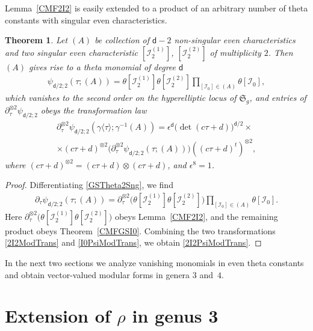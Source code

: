 \documentclass[twoside]{amsart}
\newcommand{\I}{\mathcal{I}}
\newcommand{\dd}{\textsf{d}}
\newtheorem{theo}{Theorem}[section]
\theoremstyle{definition}
\theoremstyle{plain}
\begin{document}
Lemma~\ref{CMF2I2} is easily extended to a product of an arbitrary number 
of theta constants with singular even characteristics.

\begin{theo}\label{CMFGS2I2}
Let $(A)$ be collection of $\dd-2$ non-singular even characteristics 
and two singular even characteristic $[\I_2^{(1)}]$, $[\I_2^{(2)}]$ of multiplicity $2$. 
Then  $(A)$ gives rise to a theta monomial of degree $\dd$
\begin{gather}\label{GSTheta2Sng}
\psi_{\dd/2;2}(\tau; (A)) 
= \theta[\I_2^{(1)}] \theta[\I_2^{(2)}] \prod_{[\I_0] \in (A)} \theta[\I_0],
\end{gather}
which vanishes to the second order on the hyperelliptic locus of $\mathfrak{S}_g$,
and entries of $\partial^{\otimes 2}_{\tau} \psi_{\dd/2;2}$
obeys the transformation law
\begin{multline}\label{2I2PsiModTrans}
\partial^{\otimes 2}_{\tau} \psi_{\dd/2;2}(\gamma \langle \tau \rangle; \gamma^{-1}(A)) = 
\epsilon^{\dd} \big(\!\det (c\tau+d) \big)^{\dd/2} \times \\
\times  (c\tau+d)^{\otimes 2}
\big(\partial^{\otimes 2}_{\tau} \psi_{\dd/2;2}(\tau; (A)) \big)
((c\tau+d)^t)^{\otimes 2},
\end{multline}
where $(c\tau+d)^{\otimes 2}= (c\tau+d) \otimes (c\tau+d)$, and $\epsilon^8=1$.
\end{theo}
\begin{proof}
Differentiating \eqref{GSTheta2Sng}, we find
\begin{gather}\label{GSTheta2SngDer}
\partial_\tau \psi_{\dd/2;2}(\tau; (A)) =  \partial^{\otimes 2}_{\tau}\big(\theta[\I_2^{(1)}] \theta[\I_2^{(2)}] \big)
\prod_{[\I_0] \in (A)} \theta[\I_0].
\end{gather}
Here $\partial^{\otimes 2}_{\tau}\big(\theta[\I_2^{(1)}] \theta[\I_2^{(2)}] \big)$ obeys Lemma~\ref{CMF2I2},
and the remaining product  obeys Theorem~\ref{CMFGSI0}.
Combining the two transformations \eqref{2I2ModTrans} and \eqref{I0PsiModTrans},
 we obtain \eqref{2I2PsiModTrans}.
\end{proof}

In the next two sections we analyze vanishing monomials in even theta constants and
obtain vector-valued modular forms in genera $3$ and~$4$.


\section{Extension of $\rho$ in genus 3}
\end{document}
